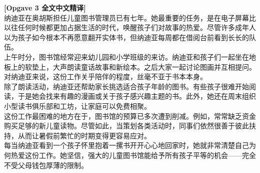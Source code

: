 \begin{transbox}
\small
\textbf{\color{NCDTeal}[Opgave 3 全文中文精译]}\\
纳迪亚在奥胡斯担任儿童图书管理员已有七年。她最重要的任务，是在电子屏幕比以往任何时候都更加占据生活的时代，唤醒孩子们对故事的热爱。尽管许多成年人以为孩子如今根本不再愿意翻开实体书，但纳迪亚每周都在借阅台前看到长长的队伍。\\[3pt]
上午时分，图书馆经常迎来幼儿园和小学班级的来访。纳迪亚和孩子们一起坐在地板上的软垫上，大声朗读童话故事和新绘本。之后大家一起讨论图画并互相提问。对纳迪亚来说，这份工作关乎陪伴的程度，丝毫不亚于书本本身。\\[3pt]
除了朗读活动，纳迪亚还帮助家长挑选适合孩子年龄的图书。有些孩子很难开始阅读，于是她会找来有趣的漫画或关于孩子感兴趣主题的书。此外，她还在周末组织小型读书俱乐部和工坊，让家庭可以免费相聚。\\[3pt]
这份工作最困难的地方在于，图书馆的预算已多次遭到削减。例如，常常缺乏资金购买足够的新儿童读物。尽管如此，当策划各类活动时，同事们依然很善于彼此扶持，从而让暑假前繁忙的时期变得更容易应对。\\[3pt]
每当纳迪亚看到一个孩子怀里抱着一摞书开开心心地回家时，她就非常清楚自己为何热爱这份工作。她坚信，强大的儿童图书馆能给予所有孩子平等的机会——完全不受父母钱包厚薄的限制。
\end{transbox}

